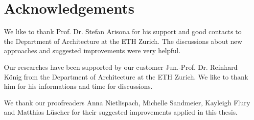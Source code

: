 \section{Acknowledgements}

We like to thank Prof. Dr. Stefan Arisona for his support and good contacts to the Department of Architecture at the ETH Zurich. The discussions about new approaches and suggested improvements were very helpful.

Our researches have been supported by our customer Jun.-Prof. Dr. Reinhard König from the Department of Architecture at the ETH Zurich. We like to thank him for his informations and time for discussions.

We thank our proofreaders Anna Nietlispach, Michelle Sandmeier, Kayleigh Flury and Matthias Lüscher for their suggested improvements applied in this thesis.